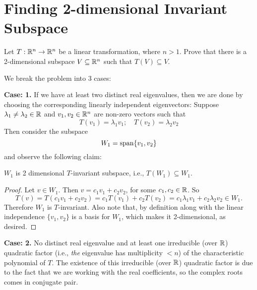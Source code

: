 \documentclass[11pt, a4paper, abstract=true]{scrartcl}
\begin{document}
\newpage

\section{Finding 2-dimensional Invariant Subspace}

\begin{problem*}
    Let \(T: \mathbb R^n \to \mathbb R^n\) be a linear transformation, where \(n > 1\). Prove that there is a 2-dimensional subspace \(V \subseteq \mathbb R^n\) such that \(T(V) \subseteq V\).
\end{problem*}

\begin{soln}
    We break the problem into 3 cases:

    \noindent\textbf{Case: 1.} If we have at least two distinct real eigenvalues, then we are done by choosing the corresponding linearly independent eigenvectors: Suppose \(\lambda_1 \neq \lambda_2 \in \mathbb R\) and \(v_1, v_2 \in \mathbb R^n\) are non-zero vectors such that \[T(v_1) = \lambda_1 v_1; \quad T(v_2) = \lambda_2 v_2\]
    Then consider the subspace 
    \[W_1 = \operatorname{span}\{v_1, v_2\}\]
    and observe the following claim:
    \begin{claim*}[1]
        \(W_1\) is 2 dimensional \(T\)-invariant subspace, i.e., \(T(W_1) \subseteq W_1\).
    \end{claim*}
    \begin{proof}
        Let \(v \in W_1\). Then \(v = c_1v_1 + c_2v_2\), for some \(c_1, c_2 \in \mathbb R\). So \[T(v) = T(c_1v_1 + c_2v_2) = c_1T(v_1) + c_2T(v_2) = c_1\lambda_1 v_1 + c_2\lambda_2 v_2 \in W_1.\]
        Therefore \(W_1\) is \(T\)-invariant. Also note that, by definition along with the linear independence \(\{v_1, v_2\}\) is a basis for \(W_1\), which makes it 2-dimensional, as desired.
    \end{proof}
    
    \noindent\textbf{Case: 2.} No distinct real eigenvalue and at least one irreducible (over \(\mathbb R\)) quadratic factor (i.e., \emph{the} eigenvalue has multiplicity \(< n\)) of the characteristic polynomial of \(T\). The existence of this irreducible (over \(\mathbb R\)) quadratic factor is due to the fact that we are working with the real coefficients, so the complex roots comes in conjugate pair.


\end{soln}
\end{document}
